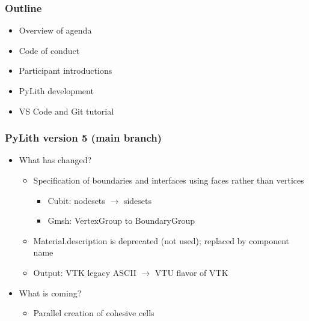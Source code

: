 \documentclass[aspectratio=169]{beamer}
\begin{document}
\begin{frame}
  \frametitle{Outline}
  \summary{}
  
  \begin{itemize}
  \item Overview of agenda
  \item Code of conduct
  \item Participant introductions
  \item PyLith development
  \item VS Code and Git tutorial
  \end{itemize}
  
\end{frame}


\begin{frame}

  
\end{frame}


\begin{frame}
  \frametitle{PyLith version 5 (main branch)}
  \summary{}
  
  \begin{itemize}
  \item What has changed?
    \begin{itemize}
    \item Specification of boundaries and interfaces using faces rather than vertices
      \begin{itemize}
      \item Cubit: nodesets $\rightarrow$ sidesets
      \item Gmsh: {\ttfamily VertexGroup} to {\ttfamily BoundaryGroup}
      \end{itemize}
    \item Material.description is deprecated (not used); replaced by component name
    \item Output: VTK legacy ASCII $\rightarrow$ VTU flavor of VTK
    \end{itemize}
  \item What is coming?
    \begin{itemize}
    \item Parallel creation of cohesive cells
    \end{itemize}
  \end{itemize}
  
\end{frame}
\end{document}
